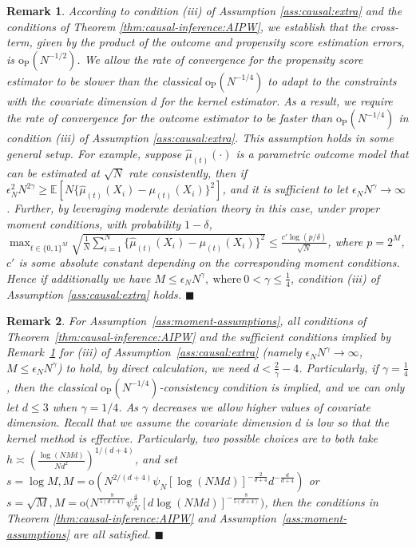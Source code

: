 \documentclass[11pt]{article}
\newtheorem{remark}{Remark}
\newcommand{\proofend}{\hfill$\blacksquare$}
\begin{document}
\begin{remark}\label{rmk:causal:1}
According to condition (iii) of Assumption \ref{ass:causal:extra} and the conditions of Theorem \ref{thm:causal-inference:AIPW}, we establish that the cross-term, given by the product of the outcome and propensity score estimation errors, is $\mathrm{o}_{\mathrm{P}}(N^{-1/2})$. We allow the rate of convergence for the propensity score estimator to be slower than the classical $\mathrm{o}_{\mathrm{P}}(N^{-1/4})$ to adapt to the constraints with the covariate dimension $d$ for the kernel estimator. As a result, we require the rate of convergence for the outcome estimator to be faster than $\mathrm{o}_{\mathrm{P}}(N^{-1/4})$ in condition (iii) of Assumption \ref{ass:causal:extra}. 
This assumption holds in some general setup. For example, suppose $\hat{\mu}_{(t)}(\cdot)$ is a parametric outcome model that can be estimated at $\sqrt{N}$ rate consistently, then if $\epsilon_N^2N^{2\gamma}\geq\mathbb{E}[N\{\hat \mu_{(t)}(X_i) - \mu_{(t)}(X_i)\}^2]$, and it is sufficient to let $\epsilon_NN^{\gamma}\rightarrow\infty$. Further, by leveraging moderate deviation theory in this case, under proper moment conditions, with probability $1-\delta$, $\max_{t\in\{0,1\}^M}\sqrt{\frac{1}{N}\sum_{i=1}^N\{\hat{\mu}_{(t)}(X_i)-\mu_{(t)}(X_i)\}^2}\leq \frac{c'\log(p/\delta)}{\sqrt{N}}$, where $p=2^M$, $c'$ is some absolute constant depending on the corresponding moment conditions. Hence if additionally we have $M\leq\epsilon_NN^{\gamma},\ \mbox{where} \ 0<\gamma\leq\frac{1}{4}$, condition (iii) of Assumption \ref{ass:causal:extra} holds.
\proofend 
\end{remark}
\begin{remark}\label{rmk:causal:2}
For Assumption~\ref{ass:moment-assumptions}, all conditions of Theorem~\ref{thm:causal-inference:AIPW} and the sufficient conditions implied by Remark~\ref{rmk:causal:1} for (iii) of Assumption~\ref{ass:causal:extra} (namely $\epsilon_NN^{\gamma}\rightarrow\infty$, $M\leq\epsilon_NN^{\gamma}$) to hold, 
by direct calculation, we need $d<\frac{2}{\gamma}-4$.
Particularly, if $\gamma=\frac{1}{4}$, then the classical $\mathrm{o}_{\mathrm{P}}(N^{-1/4})$-consistency condition is implied, and we can only let $d\leq3$ when $\gamma=1/4$. As $\gamma$ decreases we allow higher values of covariate dimension. Recall that we assume the covariate dimension $d$ is low so that the kernel method is effective. Particularly, two possible choices are to both take $h\asymp\left(\frac{\log(NMd)}{Nd^2}\right)^{1/(d+4)}$, and set $s=\log M, M=\mathrm{o}\left(N^{2/(d+4)}\psi_N[\log(NMd)]^{-\frac{2}{d+4}}d^{-\frac{d}{d+4}}\right)$ or $s=\sqrt{M}, M=\mathrm{o}\big(N^{\frac{8}{5(d+4)}}\psi_N^{\frac{4}{5}}[d\log(NMd)]^{-\frac{8}{5(d+4)}}\big)$, then the conditions in Theorem \ref{thm:causal-inference:AIPW} and Assumption~\ref{ass:moment-assumptions} are all satisfied. \proofend
\end{remark}
\end{document}
